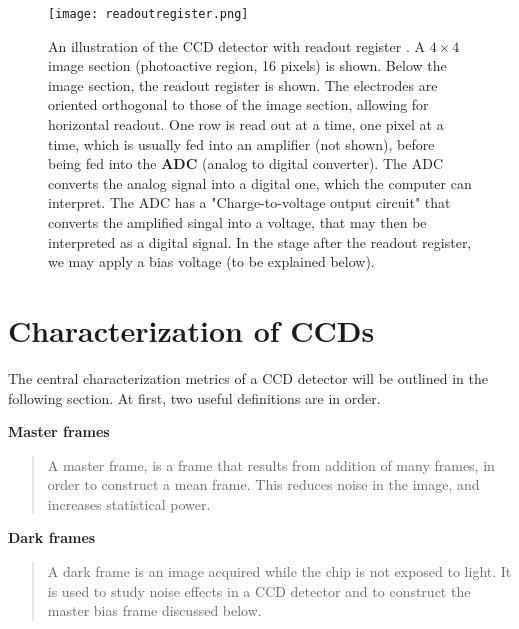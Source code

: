 \documentclass[../main.tex]{subfiles}
\begin{document}
	\begin{figure}
		\centering
		\texttt{[image: readoutregister.png]}
		\caption{An illustration of the CCD detector with readout register \cite{teledyneart}. A $4\times4$ image section (photoactive region, 16 pixels) is shown. Below the image section, the readout register is shown. The electrodes are oriented orthogonal to those of the image section, allowing for horizontal readout. One row is read out at a time, one pixel at a time, which is usually fed into an amplifier (not shown), before being fed into the \textbf{ADC} (analog to digital converter). The ADC converts the analog signal into a digital one, which the computer can interpret. The ADC has a "Charge-to-voltage output circuit" that converts the amplified singal into a voltage, that may then be interpreted as a digital signal. In the stage after the readout register, we may apply a bias voltage (to be explained below).
		} 
		\label{fig:ccdreadreg}
	\end{figure}
	
	\section{Characterization of CCDs}
	The central characterization metrics of a CCD detector will be outlined in the following section. At first, two useful definitions are in order.
	
	\begin{tcolorbox}[colframe = white, sharpish corners]
		\textbf{Master frames}
		\begin{quote}
			A master frame, is a frame that results from addition of many frames, in order to construct a mean frame. This reduces noise in the image, and increases statistical power.
		\end{quote}
	\end{tcolorbox}

	\begin{tcolorbox}[colframe = white, sharpish corners]
		\textbf{Dark frames}
		\begin{quote}
			A dark frame is an image acquired while the chip is not exposed to light. It is used to study noise effects in a CCD detector and to construct the master bias frame discussed below.
		\end{quote}
	\end{tcolorbox}
	
\end{document}
